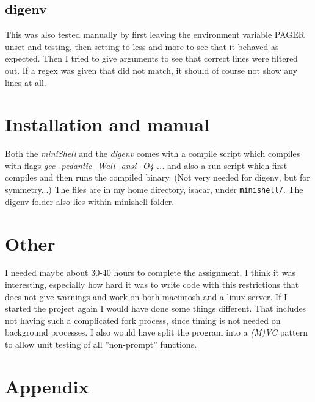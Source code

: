 \documentclass{article}
\begin{document}
    \subsection{digenv}
        This was also tested manually by first leaving the environment variable
        PAGER unset and testing, then setting to less and more to see that it
        behaved as expected. Then I tried to give arguments to see that correct
        lines were filtered out. If a regex was given that did not match, it
        should of course not show any lines at all.

\section{Installation and manual}
    Both the \emph{miniShell} and the \emph{digenv} comes with a compile script
    which compiles with flags \emph{gcc -pedantic -Wall -ansi -O4 ...} and also a
    run script which first compiles and then runs the compiled binary. (Not very
    needed for digenv, but for symmetry...) The files are in my home directory,
    isacar, under \texttt{minishell/}. The digenv folder also lies within minishell
    folder.

\section{Other}
    I needed maybe about 30-40 hours to complete the assignment. I think it was
    interesting, especially how hard it was to write code with this restrictions
    that does not give warnings and work on both macintosh and a linux server.
    If I started the project again I would have done some things different. That
    includes not having such a complicated fork process, since timing is not needed
    on background processes. I also would have split the program into a \emph{(M)VC}
    pattern to allow unit testing of all ''non-prompt'' functions.

\newpage
\section{Appendix}
    
    
    
\end{document}
